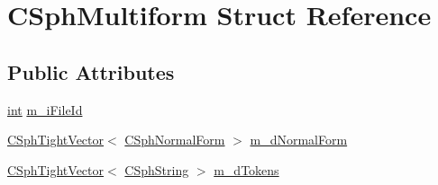 \hypertarget{structCSphMultiform}{\section{C\-Sph\-Multiform Struct Reference}
\label{structCSphMultiform}
}
\subsection*{Public Attributes}
\begin{DoxyCompactItemize}
\item 
\hyperlink{sphinxexpr_8cpp_a4a26e8f9cb8b736e0c4cbf4d16de985e}{int} \hyperlink{structCSphMultiform_a61336b1112ad769d741b7549261597d2}{m\-\_\-i\-File\-Id}
\item 
\hyperlink{classCSphTightVector}{C\-Sph\-Tight\-Vector}$<$ \hyperlink{structCSphNormalForm}{C\-Sph\-Normal\-Form} $>$ \hyperlink{structCSphMultiform_a0ebd537e222f2ba71e7e77e3379aefea}{m\-\_\-d\-Normal\-Form}
\item 
\hyperlink{classCSphTightVector}{C\-Sph\-Tight\-Vector}$<$ \hyperlink{structCSphString}{C\-Sph\-String} $>$ \hyperlink{structCSphMultiform_ad35e075e8d4e97c95c4ad9de393074d2}{m\-\_\-d\-Tokens}
\end{DoxyCompactItemize}


